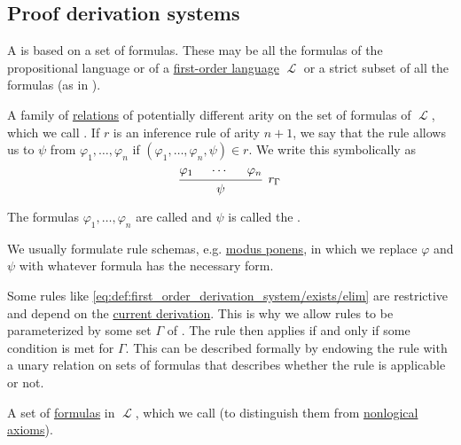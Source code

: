 \subsection{Proof derivation systems}\label{subsec:proof_derivation_systems}

\begin{definition}\label{def:proof_derivation_system}
  A  is based on a set of formulas. These may be all the formulas of the propositional language or of a \hyperref[def:first_order_syntax]{first-order language} \( \mscrL \) or a strict subset of all the formulas (as in ).

  \begin{thmenum}
     A family of \hyperref[def:relation]{relations} of potentially different arity on the set of formulas of \( \mscrL \), which we call . If \( r \) is an inference rule of arity \( n + 1 \), we say that the rule allows us to  \( \psi \) from \( \varphi_1, \ldots, \varphi_n \) if \( (\varphi_1, \ldots, \varphi_n, \psi) \in r \). We write this symbolically as
    \begin{equation*}
      \begin{prooftree}
        \hypo{\varphi_1}
        \hypo{\cdots}
        \hypo{\varphi_n}
        \infer3[\( r_\Gamma \)]{\psi}
      \end{prooftree}
    \end{equation*}

    The formulas \( \varphi_1, \ldots, \varphi_n \) are called  and \( \psi \) is called the .

    We usually formulate rule schemas, e.g. \hyperref[eq:def:positive_implicational_propositional_derivation_system/rules/modus_ponens]{modus ponens}, in which we replace \( \varphi \) and \( \psi \) with whatever formula has the necessary form.

    Some rules like \eqref{eq:def:first_order_derivation_system/exists/elim} are restrictive and depend on the \hyperref[def:derivation_system_derivability]{current derivation}. This is why we allow rules to be parameterized by some set \( \Gamma \) of . The rule then applies if and only if some condition is met for \( \Gamma \). This can be described formally by endowing the rule with a unary relation on sets of formulas that describes whether the rule is applicable or not.

     A set of \hyperref[def:first_order_syntax]{formulas} in \( \mscrL \), which we call  (to distinguish them from \hyperref[def:derivation_system_derivability]{nonlogical axioms}).
  \end{thmenum}
\end{definition}

